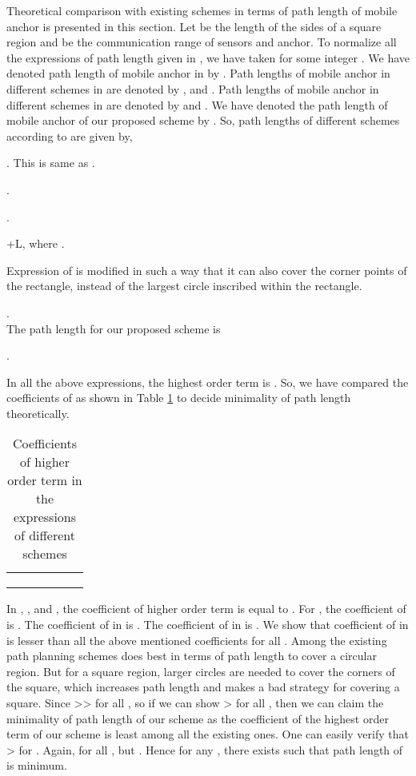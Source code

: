 \documentclass[preprint,11pt]{elsarticle}
\begin{document}
Theoretical comparison with existing schemes \cite{Huang2007,Koutsonikolas2007,Chia-Ho-Ou2013} in terms of path length of mobile anchor
is presented in this section. Let  be the length of the sides of a square region and  be the communication range of sensors and anchor.
To normalize all the expressions of path length given in \cite{Chia-Ho-Ou2013}, we have taken  for some integer .
We have denoted path length of mobile anchor in \cite{Chia-Ho-Ou2013} by . Path lengths of mobile anchor in different schemes in \cite{Koutsonikolas2007} are denoted by ,  and . Path lengths of mobile anchor in different schemes in \cite{Huang2007} are denoted by  and . We have denoted the path length of mobile anchor of our proposed scheme by . So, path lengths of different schemes according to \cite{Chia-Ho-Ou2013} are given by,

. This is same as .

.

.

+L, where .

Expression of  is modified in such a way that it can also cover the corner points of the rectangle, instead of the largest circle inscribed within the rectangle.

.\\
The path length for our proposed scheme is

.

In all the above expressions, the highest order term is . So, we have compared the coefficients of  as shown in Table \ref{table:1} to decide minimality of path length theoretically.

\begin{table}[h]
\center
\caption{Coefficients of higher order term  in the expressions of different schemes}
\label{table:1}
\begin{tabular}{c|c|c|c|c|c}
\hline
\hline
 &         &  &       &      &   \\
&&&&&\\
\hline
 &  &   &     &  & \\
\hline
\hline
\end{tabular}
\end{table}

In , , and , the coefficient of higher order term  is equal to .
For , the coefficient of  is . The coefficient of  in  is .
The coefficient of  in  is .
We show that coefficient of  in  is lesser than all the above mentioned coefficients for all .
Among the existing path planning schemes  does best in terms of path length to cover a circular region. But for a square region, larger circles are needed to cover the corners of the square, which increases path length and makes  a bad strategy for covering a square.
Since >> for all , so if we can show
> for all , then we can claim the minimality of path length of our scheme as the coefficient of the highest order term  of our scheme is least among all the existing ones.
One can easily verify that > for . Again, for all ,  but . Hence for any , there exists  such that path length of  is minimum.
\end{document}
